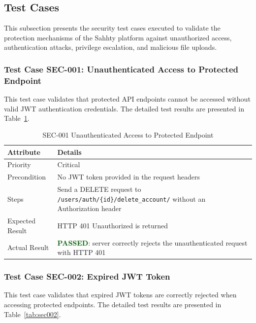 \subsection{Test Cases}
This subsection presents the security test cases executed to validate the protection mechanisms of the Sahhty platform against unauthorized access, authentication attacks, privilege escalation, and malicious file uploads.
\subsubsection{Test Case SEC-001: Unauthenticated Access to Protected Endpoint}

This test case validates that protected API endpoints cannot be accessed without valid JWT authentication credentials. The detailed test results are presented in Table~\ref{tab:sec001}.

\begin{table}[H]
\centering
\caption{SEC-001 Unauthenticated Access to Protected Endpoint}
\label{tab:sec001}
\renewcommand{\arraystretch}{1.3}

\begin{tabular}{|p{2cm}|p{13cm}|}
\hline
\rowcolor{red!10}

\textbf{Attribute} & \textbf{Details} \\
\hline
Priority & Critical \\
\hline
Precondition & No JWT token provided in the request headers \\
\hline
Steps & Send a DELETE request to \texttt{/users/auth/\{id\}/delete\_account/} without an Authorization header \\
\hline
Expected Result & HTTP 401 Unauthorized is returned \\
\hline
Actual Result & \textbf{\textcolor{darkgreen}{PASSED}}: server correctly rejects the unauthenticated request with HTTP 401 \\
\hline
\end{tabular}
\end{table}
\subsubsection{Test Case SEC-002: Expired JWT Token}

This test case validates that expired JWT tokens are correctly rejected when accessing protected endpoints. The detailed test results are presented in Table~\ref{tab:sec002}.

